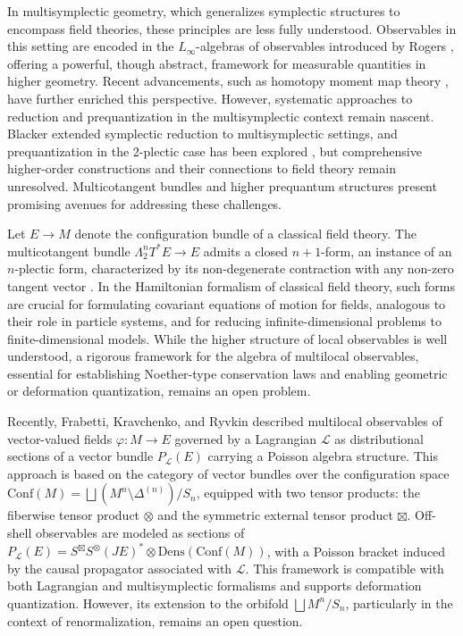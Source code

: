 \documentclass[a4paper]{article}
\begin{document}
In multisymplectic geometry, which generalizes symplectic structures to encompass field theories, these principles are less fully understood. Observables in this setting are encoded in the $L_\infty$-algebras of observables introduced by Rogers \cite{Rogers2010}, offering a powerful, though abstract, framework for measurable quantities in higher geometry. Recent advancements, such as homotopy moment map theory \cite{Callies2016}, have further enriched this perspective. However, systematic approaches to reduction and prequantization in the multisymplectic context remain nascent. Blacker \cite{Blacker2020} extended symplectic reduction to multisymplectic settings, and prequantization in the 2-plectic case has been explored \cite{Rogers2013, Sevestre2021}, but comprehensive higher-order constructions and their connections to field theory remain unresolved. Multicotangent bundles and higher prequantum structures present promising avenues for addressing these challenges.

Let $E \to M$ denote the configuration bundle of a classical field theory. The multicotangent bundle $\Lambda^n_2T^*E \to E$ admits a closed $n+1$-form, an instance of an $n$-plectic form, characterized by its non-degenerate contraction with any non-zero tangent vector \cite{Ryvkin2018, Roman-Roy09}. In the Hamiltonian formalism of classical field theory, such forms are crucial for formulating covariant equations of motion for fields, analogous to their role in particle systems, and for reducing infinite-dimensional problems to finite-dimensional models. While the higher structure of local observables is well understood, a rigorous framework for the algebra of multilocal observables, essential for establishing Noether-type conservation laws and enabling geometric or deformation quantization, remains an open problem.

Recently, Frabetti, Kravchenko, and Ryvkin \cite{Frabetti2024} described multilocal observables of vector-valued fields $\varphi: M \to E$ governed by a Lagrangian $\mathcal{L}$ as distributional sections of a vector bundle $P_{\mathcal{L}}(E)$ carrying a Poisson algebra structure. This approach is based on the category of vector bundles over the configuration space $\mathrm{Conf}(M) = \bigsqcup (M^n \setminus \Delta^{(n)}) / S_n$, equipped with two tensor products: the fiberwise tensor product $\otimes$ and the symmetric external tensor product $\boxtimes$. Off-shell observables are modeled as sections of $P_{\mathcal{L}}(E) = S^{\boxtimes}S^{\otimes}(JE)^* \otimes \mathrm{Dens}(\mathrm{Conf}(M))$, with a Poisson bracket induced by the causal propagator associated with $\mathcal{L}$. This framework is compatible with both Lagrangian and multisymplectic formalisms and supports deformation quantization. However, its extension to the orbifold $\bigsqcup M^n / S_n$, particularly in the context of renormalization, remains an open question.
\end{document}
